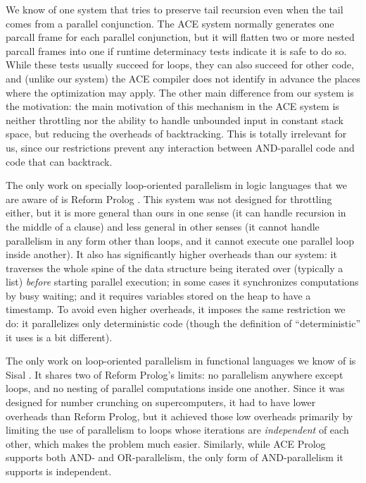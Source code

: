 We know of one system that tries to preserve tail recursion
even when the tail comes from a parallel conjunction.
The ACE system \cite{gupta01:optimization_for_parallel_nodet_code}
normally generates one parcall frame for each parallel conjunction,
but it will flatten two or more nested parcall frames into one
if runtime determinacy tests indicate it is safe to do so.
While these tests usually succeed for loops,
they can also succeed for other code,
and (unlike our system) the ACE compiler does not identify in advance
the places where the optimization may apply.
The other main difference from our system is the motivation:
the main motivation of this mechanism in the ACE system is
neither throttling
nor the ability to handle unbounded input in constant stack space,
but reducing the overheads of backtracking.
This is totally irrelevant for us,
since our restrictions prevent any interaction
between AND-parallel code and code that can backtrack.

The only work on specially loop-oriented parallelism in logic languages
that we are aware of is Reform Prolog \cite{Bevemyr93reformprolog}.
This system was not designed for throttling either,
but it is more general than ours in one sense
(it can handle recursion in the middle of a clause)
and less general in other senses
(it cannot handle parallelism in any form other than loops,
and it cannot execute one parallel loop inside another).
It also has significantly higher overheads than our system:
it traverses the whole spine of the data structure being iterated over
(typically a list) \emph{before} starting parallel execution;
in some cases it synchronizes computations by busy waiting;
and it requires variables stored on the heap to have a timestamp.
To avoid even higher overheads,
it imposes the same restriction we do:
it parallelizes only deterministic code
(though the definition of ``deterministic'' it uses is a bit different).

The only work on loop-oriented parallelism in functional languages
we know of is Sisal \cite{sisal}.
It shares two of Reform Prolog's limits:
no parallelism anywhere except loops, and
no nesting of parallel computations inside one another.
Since it was designed for number crunching on supercomputers,
it had to have lower overheads than Reform Prolog,
but it achieved those low overheads
primarily by limiting the use of parallelism
to loops whose iterations are \emph{independent} of each other,
which makes the problem much easier.
Similarly, while ACE Prolog supports both AND- and OR-parallelism,
the only form of AND-parallelism it supports is independent.

